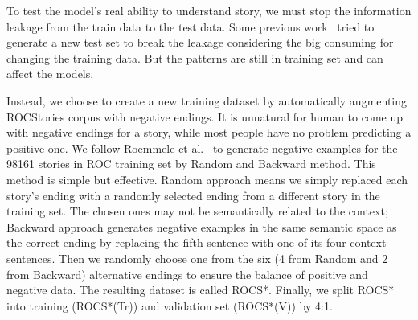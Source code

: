 To test the model's real ability to understand story, we must stop
the information leakage from the train data to the test data.
Some previous work~\cite{sharma2018tackling,schuster2019towards} tried 
to generate a new test set to break the leakage considering the big consuming 
for changing the training data.  But the patterns are still in training set  and can affect the models. 

Instead, we choose to create a new training dataset
by automatically augmenting ROCStories corpus with negative endings. 
It is unnatural for human to come up with negative
endings for a story, while most people have no problem predicting a positive
one. 
We follow Roemmele et al.~\cite{roemmele2017rnn} to generate negative 
examples for the 98161 stories in ROC training set 
by Random and Backward method.
This method is simple but effective. 
 Random approach means we simply replaced 
 each story’s ending with a randomly selected ending from a different 
 story in the training set.  
 The chosen ones may not be semantically related to the context;
 Backward approach generates negative examples 
 in the same semantic space as the correct ending by replacing the fifth sentence 
 with one of its four context sentences. Then we randomly choose one 
from the six (4 from Random and 2 from Backward) 
alternative endings to ensure the balance of positive and negative data. 
The resulting dataset is called ROCS*.
Finally, we split ROCS* into training (ROCS*(Tr)) and 
validation set (ROCS*(V)) by 4:1. 

